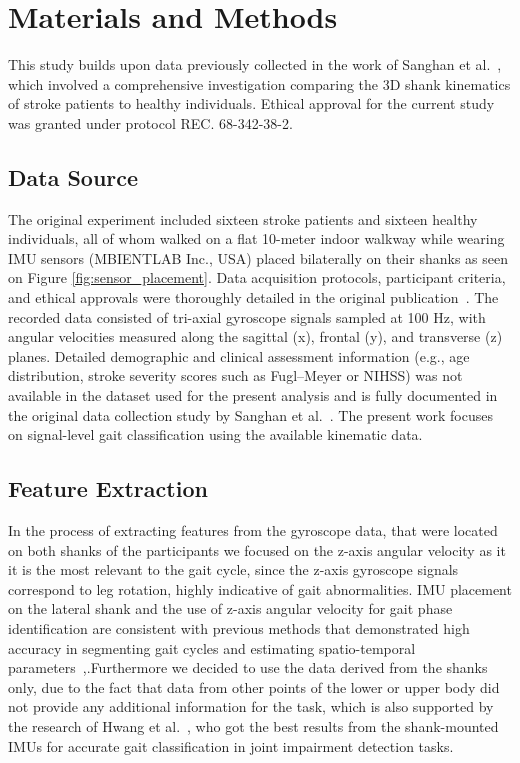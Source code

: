 \section{Materials and Methods}
\label{sec:materials_and_methods}
This study builds upon data previously collected in the work of Sanghan et al.~\cite{ref35}, which involved a comprehensive investigation comparing the 3D 
shank kinematics of stroke patients to healthy individuals. Ethical approval for the current study was granted under protocol REC. 68-342-38-2.

\subsection{Data Source}
The original experiment included sixteen stroke patients and sixteen healthy individuals, all of whom walked on a flat 10-meter indoor walkway while wearing IMU sensors 
(MBIENTLAB Inc., USA) placed bilaterally on their shanks as seen on Figure \ref{fig:sensor_placement}. Data acquisition protocols, participant criteria, and ethical 
approvals were thoroughly detailed in the original publication~\cite{ref35}. The recorded data consisted of tri-axial gyroscope signals sampled at 100 Hz, with angular 
velocities measured along the sagittal (x), frontal (y), and transverse (z) planes. Detailed demographic and clinical assessment information (e.g., age distribution, 
stroke severity scores such as Fugl–Meyer or NIHSS) was not available in the dataset used for the present analysis and is fully documented in the original data 
collection study by Sanghan et al.~\cite{ref35}. The present work focuses on signal-level gait classification using the available kinematic data.


\subsection{Feature Extraction}
In the process of extracting features from the gyroscope data, that were located on both shanks of the participants we focused on the z-axis angular velocity 
as it it is the most relevant to the gait cycle, since the z-axis gyroscope signals correspond to leg rotation, highly indicative of gait abnormalities.
IMU placement on the lateral shank and the use of z-axis angular velocity for gait phase identification are consistent with previous methods that demonstrated high 
accuracy in segmenting gait cycles and estimating spatio-temporal parameters~\cite{ref36},\cite{ref37}.Furthermore we decided to use the data derived from the shanks 
only, due to the fact that data from other points of the lower or upper body did not provide any additional information for the task, which is also supported by the 
research of Hwang et al.~\cite{ref38}, who got the best results from the shank-mounted IMUs for accurate gait classification in joint impairment detection tasks. 

